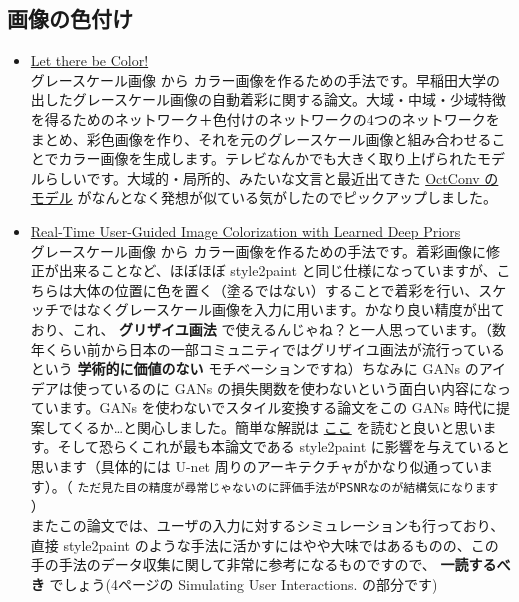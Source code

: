 \documentclass[a4paper, dvipdfmx, 10pt]{article}
\begin{document}
\subsection{画像の色付け}
\label{sec:org6101a6a}
\begin{itemize}
\item \href{http://iizuka.cs.tsukuba.ac.jp/projects/colorization/ja/}{Let there be Color!}\\

グレースケール画像 から カラー画像を作るための手法です。早稲田大学の出したグレースケール画像の自動着彩に関する論文。大域・中域・少域特徴を得るためのネットワーク＋色付けのネットワークの4つのネットワークをまとめ、彩色画像を作り、それを元のグレースケール画像と組み合わせることでカラー画像を生成します。テレビなんかでも大きく取り上げられたモデルらしいです。大域的・局所的、みたいな文言と最近出てきた \href{https://qiita.com/koshian2/items/0e40a5930f1aa63a66b9}{OctConv のモデル} がなんとなく発想が似ている気がしたのでピックアップしました。\\

\item \href{https://richzhang.github.io/ideepcolor/}{Real-Time User-Guided Image Colorization with Learned Deep Priors}\\

グレースケール画像 から カラー画像を作るための手法です。着彩画像に修正が出来ることなど、ほぼほぼ style2paint と同じ仕様になっていますが、こちらは大体の位置に色を置く（塗るではない）することで着彩を行い、スケッチではなくグレースケール画像を入力に用います。かなり良い精度が出ており、これ、 \textbf{グリザイユ画法} で使えるんじゃね？と一人思っています。（数年くらい前から日本の一部コミュニティではグリザイユ画法が流行っているという \textbf{学術的に価値のない} モチベーションですね）ちなみに GANs のアイデアは使っているのに GANs の損失関数を使わないという面白い内容になっています。GANs を使わないでスタイル変換する論文をこの GANs 時代に提案してくるか…と関心しました。簡単な解説は \href{https://github.com/DwangoMediaVillage/paper\_readings/issues/8}{ここ} を読むと良いと思います。そして恐らくこれが最も本論文である style2paint に影響を与えていると思います（具体的には U-net 周りのアーキテクチャがかなり似通っています）。（ \texttt{ただ見た目の精度が尋常じゃないのに評価手法がPSNRなのが結構気になります} ）\\

またこの論文では、ユーザの入力に対するシミュレーションも行っており、直接 style2paint のような手法に活かすにはやや大味ではあるものの、この手の手法のデータ収集に関して非常に参考になるものですので、 \textbf{一読するべき} でしょう(4ページの Simulating User Interactions. の部分です)\\


\end{itemize}
\end{document}
